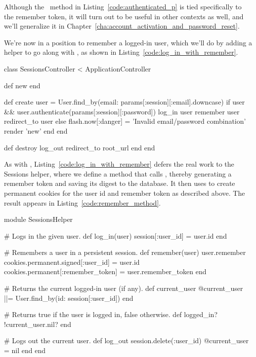 \noindent Although the \ method in Listing~\ref{code:authenticated_p} is tied specifically to the remember token, it will turn out to be useful in other contexts as well, and we'll generalize it in Chapter~\ref{cha:account_activation_and_password_reset}.

We're now in a position to remember a logged-in user, which we'll do by adding a  helper to go along with , as shown in Listing~\ref{code:log_in_with_remember}.

\begin{codelisting}
\label{code:log_in_with_remember}
\begin{code}
class SessionsController < ApplicationController

  def new
  end

  def create
    user = User.find_by(email: params[:session][:email].downcase)
    if user && user.authenticate(params[:session][:password])
      log_in user
      remember user
      redirect_to user
    else
      flash.now[:danger] = 'Invalid email/password combination'
      render 'new'
    end
  end

  def destroy
    log_out
    redirect_to root_url
  end
end
\end{code}
\end{codelisting}

\noindent As with , Listing~\ref{code:log_in_with_remember} defers the real work to the Sessions helper, where we define a  method that calls , thereby generating a remember token and saving its digest to the database. It then uses  to create permanent cookies for the user id and remember token as described above. The result appears in Listing~\ref{code:remember_method}.

\begin{codelisting}
\label{code:remember_method}
\begin{code}
module SessionsHelper

  # Logs in the given user.
  def log_in(user)
    session[:user_id] = user.id
  end

  # Remembers a user in a persistent session.
  def remember(user)
    user.remember
    cookies.permanent.signed[:user_id] = user.id
    cookies.permanent[:remember_token] = user.remember_token
  end

  # Returns the current logged-in user (if any).
  def current_user
    @current_user ||= User.find_by(id: session[:user_id])
  end

  # Returns true if the user is logged in, false otherwise.
  def logged_in?
    !current_user.nil?
  end

  # Logs out the current user.
  def log_out
    session.delete(:user_id)
    @current_user = nil
  end
end
\end{code}
\end{codelisting}

